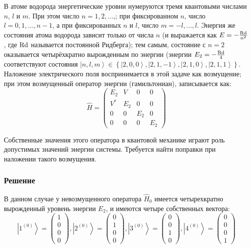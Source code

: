 \documentclass[a4paper,12pt]{article}
\begin{document}
В атоме водорода энергетические уровни нумеруются тремя квантовыми
числами $n$, $l$ и $m$. При этом число $n=1,2,\dots$,; при фиксированном
$n$, число $l=0,1,\dots,n-1$, а при фиксированных $n$ и $l$, число
$m=-l,\dots,l$. Энергия же состояния атома водорода зависит только
от числа $n$ (и выражается как $E=-\frac{{\rm Rd}}{n^{2}}$, где
${\rm Rd}$ называется постоянной Ридберга); тем самым, состояние
с $n=2$ оказывается четырёхкратно вырожденным по энергии (энергии
$E_{2}=-\frac{{\rm Rd}}{4}$ соответствуют состояния $\left|n,l,m\right\rangle \in\left\{ \left|2,0,0\right\rangle ,\left|2,1,-1\right\rangle ,\left|2,1,0\right\rangle ,\left|2,1,1\right\rangle \right\} $.
Наложение электрического поля воспринимается в этой задаче как возмущение;
при этом возмущенный оператор энергии (гамильтониан), записывается
как:
\[
\hat{H}=\begin{pmatrix}E_{2} & V & 0 & 0\\
V^{*} & E_{2} & 0 & 0\\
0 & 0 & E_{2} & 0\\
0 & 0 & 0 & E_{2}
\end{pmatrix}
\]


\noindent
Собственные значения этого оператора в квантовой механике играют роль
допустимых значений энергии системы. Требуется найти поправки при
наложении такого возмущения.


\subsubsection*{Решение}

В данном случае у невозмущенного оператора $\hat{H}_{0}$ имеется
четырехкратно вырожденный уровень энергии $E_{2}$, и имеются четыре
собственных вектора:
\[
\left|1^{(0)}\right\rangle =\begin{pmatrix}1\\
0\\
0\\
0
\end{pmatrix},\left|2^{(0)}\right\rangle =\begin{pmatrix}0\\
1\\
0\\
0
\end{pmatrix},\left|3^{(0)}\right\rangle =\begin{pmatrix}0\\
0\\
1\\
0
\end{pmatrix},\left|4^{(0)}\right\rangle =\begin{pmatrix}0\\
0\\
0\\
1
\end{pmatrix}
\]
\end{document}
